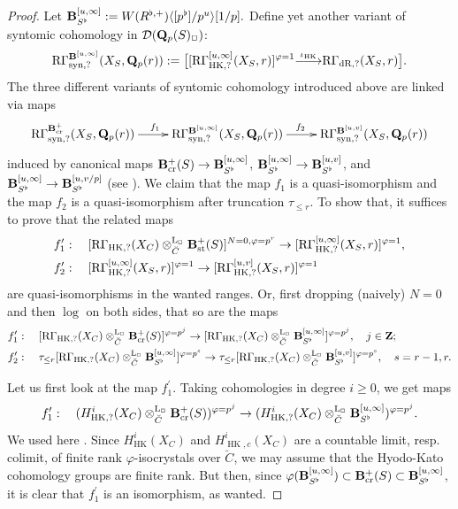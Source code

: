 \documentclass[10pt,reqno]{amsart}
\theoremstyle{definition}
\theoremstyle{remark}
\def\lomapr#1{\smash{\mathop{\relbar\joinrel\longrightarrow}\limits^{#1}}}
\def\phi{\varphi}
\newcommand{\dr}{\operatorname{dR} }
\newcommand{\synt}{ \operatorname{syn} }
\newcommand{\st}{\operatorname{st} }
\newcommand{\crr}{\operatorname{cr} }
\newcommand{\hk}{\operatorname{HK} }
\newcommand{\LL}{\operatorname{L} }
\newcommand{\sd}{{\mathcal{D}}}
\numberwithin{equation}{section}
\def\R{{\mathrm R}}
\def\Q{{\bf Q}} \def\Z{{\bf Z}}
\numberwithin{equation}{section}
\begin{document}
    \begin{proof}
     Let  
   ${\bf B}_{S^{\flat}}^{[u,\infty]} := W(R^{\flat,+})\langle[p^{\flat}]/p^u\rangle[1/p].$  Define yet another variant of syntomic cohomology in $\sd(\Q_{p}(S)_{\Box})$:
    \begin{equation*}
    \R\Gamma^{\B^{[u,\infty]}}_{\synt,?}(X_S,\Q_p(r))
:=\big[[\R\Gamma_{\hk,?}^{{[u,\infty]}}(X_S,r)]^{\phi=1}\lomapr{\iota_{\hk}}\R\Gamma_{\dr,?}(X_S,r)\big].
    \end{equation*}
    The three different variants of syntomic cohomology introduced above are linked via maps
    $$
    \xymatrix{
    \R\Gamma^{\B_{\crr}^+}_{\synt,?}(X_S,\Q_p(r))\ar[r]^{f_1} &  \R\Gamma^{\B^{[u,\infty]}}_{\synt,?}(X_S,\Q_p(r)) \ar[r]^{f_2} &  \R\Gamma^{\B^{[u,v]}}_{\synt,?}(X_S,\Q_p(r))
    }
    $$
    induced by canonical maps $\B^+_{\crr}(S)\to \B_{S^{\flat}}^{[u,\infty]}$,  
${\bf B}_{S^{\flat}}^{[u,\infty]}\to {\bf B}_{S^{\flat}}^{[u,v]}$, and ${\bf B}_{S^{\flat}}^{[u,\infty]}\to {\bf B}_{S^{\flat}}^{[u,v/p]}$ (see \cite[Sec.\,2.4.2]{CN1}). 
    We claim that the map $f_1$ is a quasi-isomorphism and the map $ f_2$ is a  quasi-isomorphism after truncation $\tau_{\leq r}$. To show that, it suffices to prove that the related maps 
  \begin{align*}
&  f^{\prime}_1:\quad [\R\Gamma_{\hk,?}(X_C)\otimes^{\LL_{\Box}}_{\breve{C}}\B^+_{\st}(S)]^{N=0,\phi=p^r}  \to 
  [\R\Gamma_{\hk,?}^{{[u,\infty]}}(X_S,r)]^{\phi=1},\\
&  f^{\prime}_2:\quad [\R\Gamma_{\hk,?}^{{[u,\infty]}}(X_S,r)]^{\phi=1} \to [\R\Gamma_{\hk,?}^{{[u,v]}}(X_S,r)]^{\phi=1}
  \end{align*}
  are quasi-isomorphisms in the wanted ranges. Or, first  dropping (naively)  $N=0$ and then $\log$ on both sides, that so are the maps 
\begin{align*}
&  f^{\prime}_1:\quad [\R\Gamma_{\hk,?}(X_C)\otimes^{\LL_{\Box}}_{\breve{C}}\B^+_{\crr}(S)]^{\phi=p^j}  \to 
  [\R\Gamma_{\hk,?}(X_C)\otimes^{\LL_{\Box}}_{\breve{C}}\B_{S^{\flat}}^{[u,\infty]}]^{\phi=p^j},\quad j\in\Z;\\
&  f^{\prime}_2:\quad\tau_{\leq r} [\R\Gamma_{\hk,?}(X_C)\otimes^{\LL_{\Box}}_{\breve{C}}\B_{S^{\flat}}^{[u,\infty]}]^{\phi=p^s} \to \tau_{\leq r}
 [\R\Gamma_{\hk,?}(X_C)\otimes^{\LL_{\Box}}_{\breve{C}}\B_{S^{\flat}}^{[u,v]}]^{\phi=p^s}, \quad s=r-1,r.
  \end{align*}
  
  Let us first look at the map $f^{\prime}_1$. Taking cohomologies  in degree $i\geq 0$, we get maps
  \begin{align*}
  f^{\prime}_1:\quad (H^i_{\hk,?}(X_C)\otimes^{\LL_{\Box}}_{\breve{C}}\B^+_{\crr}(S))^{\phi=p^j}  \to 
 (H^i_{\hk,?}(X_C)\otimes^{\LL_{\Box}}_{\breve{C}}\B_{S^{\flat}}^{[u,\infty]})^{\phi=p^j}.
 \end{align*}
 We used here \cite[Prop.\,5.8]{CN4}. Since $H^i_{\hk}(X_C)$ and $H^i_{\hk,c}(X_C)$ are a countable limit, resp. colimit, of finite rank $\phi$-isocrystals over $\breve{C}$, we may assume that  the Hyodo-Kato cohomology groups are finite rank. But then, since $\phi(\B_{S^{\flat}}^{[u,\infty]})\subset \B^+_{\crr}(S)\subset \B_{S^{\flat}}^{[u,\infty]}$, it is clear that $f_1^{\prime}$ is an isomorphism, as wanted. 



\end{proof}
\end{document}
